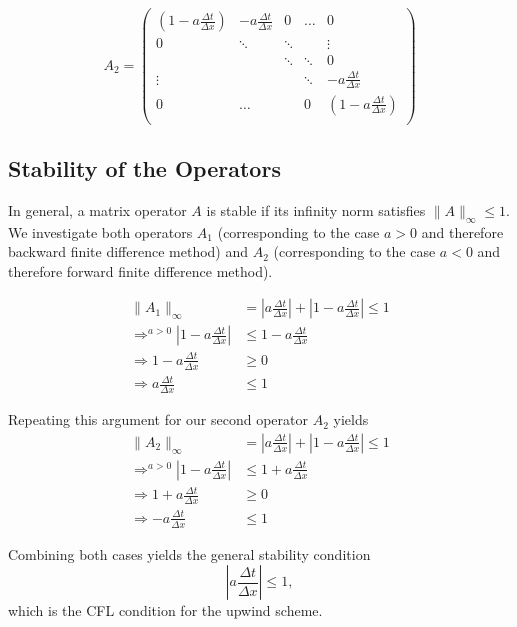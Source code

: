 $$ 
A_2 = \begin{pmatrix}
 \left(1-a\frac{\Delta t}{\Delta x}\right) & -a\frac{\Delta t}{\Delta x}
 & 0 & \dots & 0 \\
 0 & \ddots & \ddots & & \vdots \\
 &  & \ddots & \ddots & 0 \\
 \vdots & & & \ddots & -a\frac{\Delta t}{\Delta x}\\
 0 & \dots &  & 0 & \left(1-a\frac{\Delta t}{\Delta x}\right) \\
\end{pmatrix} $$

\subsection{Stability of the Operators}
In general, a matrix operator $A$ is stable if its infinity norm satisfies
$\|A\|_{\infty} \leq 1$. We investigate both operators $A_1$ 
(corresponding to the case $a > 0$ and therefore backward finite
difference method) and $A_2$ (corresponding to the case $a < 0$ and
therefore forward finite difference method).

\begin{align}
    \|A_1\|_{\infty} &= \left|a\frac{\Delta t}{\Delta x}\right| + \left|
        1- a \frac{\Delta t}{\Delta x}\right| \leq 1 \\
    \Rightarrow^{a> 0}  \left|1- a \frac{\Delta t}{\Delta x}\right| &\leq
    1 - a \frac{\Delta t}{\Delta x} \\
    \Rightarrow 1 - a\frac{\Delta t}{\Delta x} &\geq 0 \\
    \Rightarrow a \frac{\Delta t}{\Delta x}&\leq 1 
\end{align}

Repeating this argument for our second operator $A_2$ yields
\begin{align}
    \|A_2\|_{\infty} &= \left|a\frac{\Delta t}{\Delta x}\right| + 
    \left|1- a \frac{\Delta t}{\Delta x}\right| \leq 1 \\
    \Rightarrow^{a> 0}  \left|1- a \frac{\Delta t}{\Delta x}\right| 
    &\leq 1 + a \frac{\Delta t}{\Delta x} \\
    \Rightarrow 1 + a\frac{\Delta t}{\Delta x} &\geq 0 \\
    \Rightarrow - a \frac{\Delta t}{\Delta x}&\leq 1 
\end{align}

Combining both cases yields the general stability condition
$$\left|a\frac{\Delta t}{\Delta x}\right| \leq 1,$$ 
which is the CFL condition for the upwind scheme.

